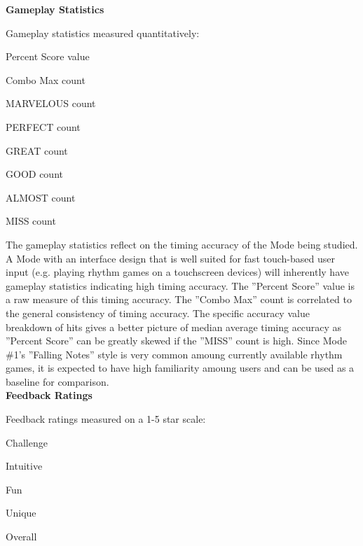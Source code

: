 \documentclass{sig-alternate}
\begin{document}
\noindent \textbf{Gameplay Statistics}

\vspace{+3pt}Gameplay statistics measured quantitatively:
\vspace{-3pt}\begin{itemize*}
	\item Percent Score value\vspace{+3pt}
	\item Combo Max count\vspace{+3pt}
	\item MARVELOUS count\vspace{+3pt}
	\item PERFECT count\vspace{+3pt}
	\item GREAT count\vspace{+3pt}
	\item GOOD count\vspace{+3pt}
	\item ALMOST count\vspace{+3pt}
	\item MISS count\vspace{+3pt}
\end{itemize*}

The gameplay statistics reflect on the timing accuracy of the Mode being studied. A Mode with an interface design that is well suited for fast touch-based user input (e.g. playing rhythm games on a touchscreen devices) will inherently have gameplay statistics indicating high timing accuracy. The ''Percent Score'' value is a raw measure of this timing accuracy. The ''Combo Max'' count is correlated to the general consistency of timing accuracy. The specific accuracy value breakdown of hits gives a better picture of median average timing accuracy as ''Percent Score'' can be greatly skewed if the ''MISS'' count is high. Since Mode \#1's ''Falling Notes'' style is very common amoung currently available rhythm games, it is expected to have high familiarity amoung users and can be used as a baseline for comparison.\\

\noindent \textbf{Feedback Ratings}

\vspace{+3pt}Feedback ratings measured on a 1-5 star scale:
\vspace{-3pt}\begin{itemize*}
	\item Challenge\vspace{+3pt}
	\item Intuitive\vspace{+3pt}
	\item Fun\vspace{+3pt}
	\item Unique\vspace{+3pt}
	\item Overall\vspace{+3pt}
\end{itemize*}
\end{document}
